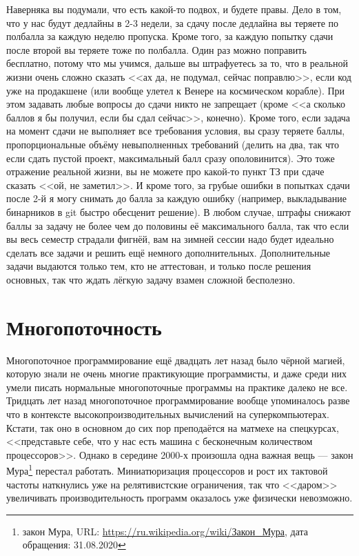 \documentclass[a5paper]{article}
\begin{document}
Наверняка вы подумали, что есть какой-то подвох, и будете правы. Дело в том, что у нас будут дедлайны в 2-3 недели, за сдачу после дедлайна вы теряете по полбалла за каждую неделю пропуска. Кроме того, за каждую попытку сдачи после второй вы теряете тоже по полбалла. Один раз можно поправить бесплатно, потому что мы учимся, дальше вы штрафуетесь за то, что в реальной жизни очень сложно сказать <<ах да, не подумал, сейчас поправлю>>, если код уже на продакшене (или вообще улетел к Венере на космическом корабле). При этом задавать любые вопросы до сдачи никто не запрещает (кроме <<а сколько баллов я бы получил, если бы сдал сейчас>>, конечно). Кроме того, если задача на момент сдачи не выполняет все требования условия, вы сразу теряете баллы, пропорциональные объёму невыполненных требований (делить на два, так что если сдать пустой проект, максимальный балл сразу ополовинится). Это тоже отражение реальной жизни, вы не можете про какой-то пункт ТЗ при сдаче сказать <<ой, не заметил>>. И кроме того, за грубые ошибки в попытках сдачи после 2-й я могу снимать до балла за каждую ошибку (например, выкладывание бинарников в git быстро обесценит решение). В любом случае, штрафы снижают баллы за задачу не более чем до половины её максимального балла, так что если вы весь семестр страдали фигнёй, вам на зимней сессии надо будет идеально сделать все задачи и решить ещё немного дополнительных. Дополнительные задачи выдаются только тем, кто не аттестован, и только после решения основных, так что ждать лёгкую задачу взамен сложной бесполезно.

\section{Многопоточность}

Многопоточное программирование ещё двадцать лет назад было чёрной магией, которую знали не очень многие практикующие программисты, и даже среди них умели писать нормальные многопоточные программы на практике далеко не все. Тридцать лет назад многопоточное программирование вообще упоминалось разве что в контексте высокопроизводительных вычислений на суперкомпьютерах. Кстати, так оно в основном до сих пор преподаётся на матмехе на спецкурсах, <<представьте себе, что у нас есть машина с бесконечным количеством процессоров>>. Однако в середине 2000-х произошла одна важная вещь --- закон Мура\footnote{закон Мура, URL: \url{https://ru.wikipedia.org/wiki/Закон\_Мура}, дата обращения: 31.08.2020} перестал работать. Миниатюризация процессоров и рост их тактовой частоты наткнулись уже на релятивистские ограничения, так что <<даром>> увеличивать производительность программ оказалось уже физически невозможно. 
\end{document}
